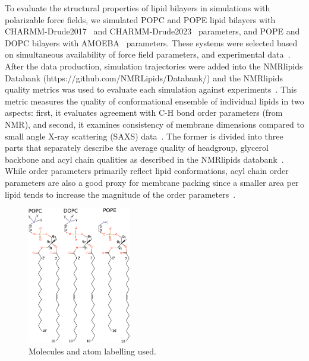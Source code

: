 \documentclass[journal=jacsat,manuscript=article,layout=singlecolumn]{achemso}
\begin{document}
To evaluate the structural properties of lipid bilayers in simulations with polarizable force fields, we simulated POPC and POPE lipid bilayers with CHARMM-Drude2017~\cite{li2017drude} and CHARMM-Drude2023~\cite{yu2023drude} parameters, and POPE and DOPC bilayers with AMOEBA~\cite{chu2018anionicpolarizable,chu2018polarizable} parameters. These systems were selected based on simultaneous availability of force field parameters, and experimental data~\cite{Databank}. After the data production, simulation trajectories were added into the NMRlipids Databank (https://github.com/NMRLipids/Databank/) and the NMRlipids quality metrics was used to evaluate each simulation against experiments~\cite{Databank}. This metric measures the quality of conformational ensemble of individual lipids in two aspects: first, it evaluates agreement with C-H bond order parameters (from NMR), and second, it examines consistency of membrane dimensions compared to small angle X-ray scattering (SAXS) data~\cite{Databank,ollila16}. 
The former is divided into three parts that separately describe the average quality of headgroup, glycerol backbone and acyl chain qualities as described in the NMRlipids databank~\cite{Databank}. While order parameters primarily reflect lipid conformations, acyl chain order parameters are also a good proxy for membrane packing since a smaller area per lipid tends to increase the magnitude of the order parameters~\cite{Databank}. 

\begin{figure}[t]
    \centering
    \includegraphics[width=0.4\textwidth]{Figures/molecules.pdf}
    \caption{Molecules and atom labelling used.}
    \label{fig:molecules}

\end{figure}
\end{document}
